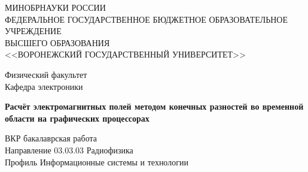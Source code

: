 \begin{titlepage}

\centering
\begingroup
\fontsize{12pt}{12pt}\selectfont
МИНОБРНАУКИ РОССИИ\\
\endgroup
\begingroup
\fontsize{11pt}{11pt}\selectfont
ФЕДЕРАЛЬНОЕ ГОСУДАРСТВЕННОЕ БЮДЖЕТНОЕ ОБРАЗОВАТЕЛЬНОЕ УЧРЕЖДЕНИЕ\\
ВЫСШЕГО ОБРАЗОВАНИЯ\\
\endgroup
\begingroup
\fontsize{12pt}{12pt}\selectfont
<<ВОРОНЕЖСКИЙ ГОСУДАРСТВЕННЫЙ УНИВЕРСИТЕТ>>\\

\vspace{20mm}

Физический факультет\\
Кафедра электроники\\
\endgroup
\vspace{25mm}

\textbf{
    Расчёт электромагнитных полей методом конечных разностей во временной области на графических процессорах}

\vspace{25mm}
\begingroup
\fontsize{12pt}{12pt}\selectfont
ВКР бакалаврская работа\\
Направление 03.03.03 Радиофизика\\
Профиль Информационные системы и технологии\\

\vspace{30mm}


\end{titlepage}
